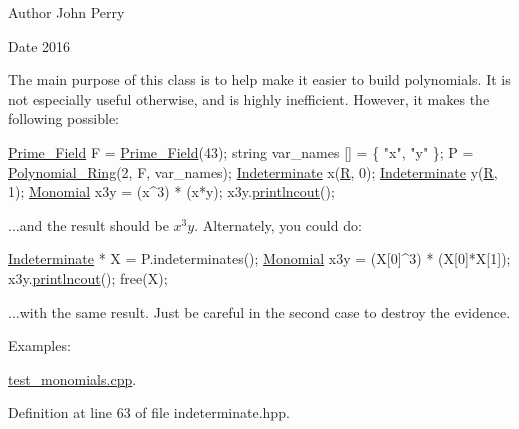 \begin{DoxyAuthor}{Author}
John Perry
\end{DoxyAuthor}
\begin{DoxyDate}{Date}
2016
\end{DoxyDate}
The main purpose of this class is to help make it easier to build polynomials. It is not especially useful otherwise, and is highly inefficient. However, it makes the following possible\+: 
\begin{DoxyCode}
\hyperlink{group___fields_group_class_prime___field}{Prime\_Field} F = \hyperlink{group___fields_group_class_prime___field}{Prime\_Field}(43);
\textcolor{keywordtype}{string} var\_names [] = \{ \textcolor{stringliteral}{"x"}, \textcolor{stringliteral}{"y"} \};
P = \hyperlink{group__polygroup_class_polynomial___ring}{Polynomial\_Ring}(2, F, var\_names);
\hyperlink{group__polygroup_class_indeterminate}{Indeterminate} x(\hyperlink{group__polygroup_a78f5339712602f11e29a091d228032c4}{R}, 0);
\hyperlink{group__polygroup_class_indeterminate}{Indeterminate} y(\hyperlink{group__polygroup_a78f5339712602f11e29a091d228032c4}{R}, 1);
\hyperlink{group__polygroup_class_monomial}{Monomial} x3y = (x^3) * (x*y);
x3y.\hyperlink{group__polygroup_a34143922dd6ce2d44a62777a8948bf97}{printlncout}();
\end{DoxyCode}
 {$\dots$}and the result should be $x^3y$. Alternately, you could do\+: 
\begin{DoxyCode}
\hyperlink{group__polygroup_class_indeterminate}{Indeterminate} * X = P.indeterminates();
\hyperlink{group__polygroup_class_monomial}{Monomial} x3y = (X[0]^3) * (X[0]*X[1]);
x3y.\hyperlink{group__polygroup_a34143922dd6ce2d44a62777a8948bf97}{printlncout}();
free(X);
\end{DoxyCode}
 {$\dots$}with the same result. Just be careful in the second case to destroy the evidence. \begin{Desc}
\item[Examples\+: ]\par
\hyperlink{test_monomials_8cpp-example}{test\+\_\+monomials.\+cpp}.\end{Desc}


Definition at line 63 of file indeterminate.\+hpp.

